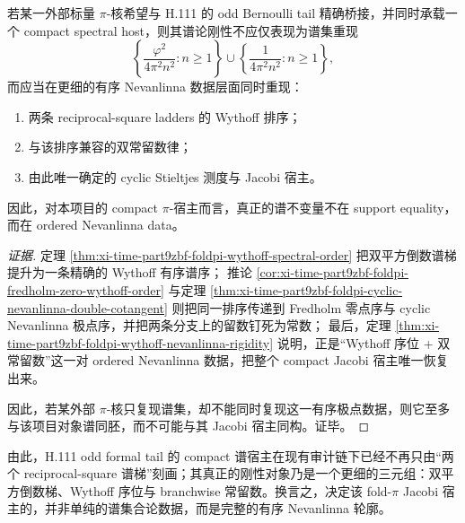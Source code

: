 \begin{conjecture}\label{conj:xi-time-part9zbf-foldpi-ordered-nevanlinna-rigidity}
若某一外部标量 \(\pi\)-核希望与 H.111 的 odd Bernoulli tail 精确桥接，并同时承载一个 compact spectral host，则其谱论刚性不应仅表现为谱集重现
\[
\left\{\frac{\varphi^2}{4\pi^2n^2}:n\ge 1\right\}
\cup
\left\{\frac{1}{4\pi^2n^2}:n\ge 1\right\},
\]
而应当在更细的有序 Nevanlinna 数据层面同时重现：
\begin{enumerate}
  \item 两条 reciprocal-square ladders 的 Wythoff 排序；
  \item 与该排序兼容的双常留数律；
  \item 由此唯一确定的 cyclic Stieltjes 测度与 Jacobi 宿主。
\end{enumerate}
因此，对本项目的 compact \(\pi\)-宿主而言，真正的谱不变量不在 support equality，而在 ordered Nevanlinna data。
\end{conjecture}
\begin{proof}[证据]
定理 \ref{thm:xi-time-part9zbf-foldpi-wythoff-spectral-order} 把双平方倒数谱梯提升为一条精确的 Wythoff 有序谱序；
推论 \ref{cor:xi-time-part9zbf-foldpi-fredholm-zero-wythoff-order} 与定理 \ref{thm:xi-time-part9zbf-foldpi-cyclic-nevanlinna-double-cotangent} 则把同一排序传递到 Fredholm 零点序与 cyclic Nevanlinna 极点序，并把两条分支上的留数钉死为常数；
最后，定理 \ref{thm:xi-time-part9zbf-foldpi-wythoff-nevanlinna-rigidity} 说明，正是“Wythoff 序位 + 双常留数”这一对 ordered Nevanlinna 数据，把整个 compact Jacobi 宿主唯一恢复出来。

因此，若某外部 \(\pi\)-核只复现谱集，却不能同时复现这一有序极点数据，则它至多与该项目对象谱同胚，而不可能与其 Jacobi 宿主同构。证毕。
\end{proof}

\noindent
由此，H.111 odd formal tail 的 compact 谱宿主在现有审计链下已经不再只由“两个 reciprocal-square 谱梯”刻画；其真正的刚性对象乃是一个更细的三元组：双平方倒数梯、Wythoff 序位与 branchwise 常留数。换言之，决定该 fold-\(\pi\) Jacobi 宿主的，并非单纯的谱集合论数据，而是完整的有序 Nevanlinna 轮廓。

\endinput
